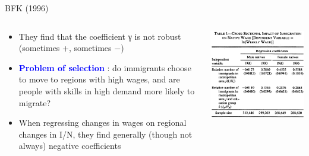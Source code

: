 \documentclass[10pt,hyperref={CJKbookmarks=true},xcolor=dvipsnames,aspectratio=169]{beamer}
\begin{document}
\begin{frame}{BFK (1996)}


\begin{columns}[onlytextwidth]
\begin{column}{0.5\textwidth}
\begin{itemize}
\item They find that the coefficient γ is not robust (sometimes +, sometimes
−) 
\item \textbf{\textcolor{blue}{Problem of selection}} : do immigrants choose
to move to regions with high wages, and are people with skills in
high demand more likely to migrate? 
\item When regressing changes in wages on regional changes in I/N, they
find generally (though not always) negative coefficients 
\end{itemize}

\end{column}
\begin{column}{0.5\textwidth}
\includegraphics[width=\columnwidth]{fig/migration/lec4-34}
\end{column}
\end{columns}

\end{frame}
\end{document}
